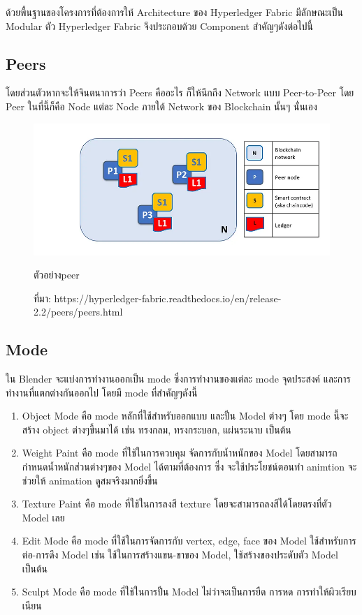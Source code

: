 ด้วยพื้นฐานของโครงการที่ต้องการให้ Architecture ของ Hyperledger Fabric มีลักษณะเป็น Modular ตัว Hyperledger Fabric จึงประกอบด้วย Component สำคัญๆดังต่อไปนี้
\subsection{Peers}
 โดยส่วนตัวหากจะให้จินตนาการว่า Peers คืออะไร ก็ให้นึกถึง Network แบบ Peer-to-Peer โดย Peer ในที่นี้ก็คือ Node แต่ละ Node ภายใต้ Network ของ Blockchain นั้นๆ นั่นเอง

 \begin{figure}[htbp]
  \centering 
  \includegraphics[scale=0.5]{peer.png}
  \caption[Peer]{ตัวอย่างpeer}
  \caption{ที่มา: https://hyperledger-fabric.readthedocs.io/en/release-2.2/peers/peers.html}
  \label{fig:Peer}
\end{figure}


\subsection{Mode}
ใน Blender จะแบ่งการทำงานออกเป็น mode ซึ่งการทำงานของแต่ละ mode จุดประสงค์ และการทำงานที่แตกต่างกันออกไป โดยมี mode ที่สำคัญๆดังนี้
\begin{enumerate}
\item Object Mode คือ mode หลักที่ใช้สำหรับออกแบบ และปั้น Model ต่างๆ โดย mode นี้จะสร้าง object ต่างๆขึ้นมาได้ เช่น 
ทรงกลม, ทรงกระบอก, แผ่นระนาบ เป็นต้น
\item Weight Paint คือ mode ที่ใช้ในการควบคุม จัดการกับน้ำหนักของ Model โดยสามารถกำหนดน้ำหนักส่วนต่างๆของ Model ได้ตามที่ต้องการ 
ซึ่ง จะใช้ประโยชน์ตอนทำ animtion จะช่วยให้ animation ดูสมจริงมากยิ่งขึ้น
\item Texture Paint คือ mode ที่ใช้ในการลงสี texture โดยจะสามารถลงสีได้โดยตรงที่ตัว Model เลย
\item Edit Mode คือ mode ที่ใช้ในการจัดการกับ vertex, edge, face ของ Model ใช้สำหรับการต่อ-การดึง Model เช่น 
ใช้ในการสร้างแขน-ขาของ Model, ใช้สร้างของประดับตัว Model เป็นต้น
\item Sculpt Mode คือ mode ที่ใช้ในการปั้น Model ไม่ว่าจะเป็นการยืด การหด การทำให้ผิวเรียบเนียน
\end{enumerate}

